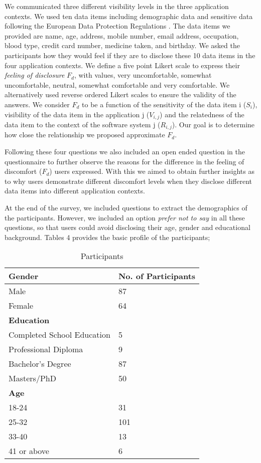 \documentclass[10pt]{article}
\begin{document}
We communicated three different visibility levels in the three application contexts. We used ten data items including demographic data and sensitive data following the European Data Protection Regulations \cite {wagner2016national}. The data items we provided are name, age, address, mobile number, email address, occupation, blood type, credit card number, medicine taken, and birthday. We asked the participants how they would feel if they are to disclose these 10 data items in the four application contexts. We define a five point Likert scale to express their \textit{feeling of disclosure} $F_d$, with values, very uncomfortable, somewhat uncomfortable, neutral, somewhat comfortable and very comfortable. We alternatively used reverse ordered Likert scales to ensure the validity of the answers. We consider $F_d$ to be a function of the sensitivity of the data item i ($S_i$), visibility of the data item in the application j ($V_{i,j}$) and the relatedness of the data item to the context of the software system j ($R_{i,j}$). Our goal is to determine how close the relationship we proposed approximate $F_d$.

Following these four questions we also included an open ended question in the questionnaire to further observe the reasons for the difference in the feeling of discomfort ($F_d$) users expressed. With this we aimed to obtain further insights as to why users demonstrate different discomfort levels when they disclose different data items into different application contexts. 

At the end of the survey, we included questions to extract the demographics of the participants. However, we included an option \textit{prefer not to say} in all these questions, so that users could avoid disclosing their age, gender and educational background. Tables 4 provides the basic profile of the participants;

\begin{center}
\begin{table}[htbp]
\caption{Participants}
\begin{center}
\begin{tabular}{|l|l|} 
\hline
\textbf{Gender} & \textbf{No. of Participants} \\
\hline
Male & 87 \\
\hline
Female & 64 \\
\hline
\multicolumn{2}{l}{\textbf{Education}} \\
\hline
Completed School Education & 5 \\
\hline
Professional Diploma & 9 \\
\hline
Bachelor's Degree & 87 \\
\hline
Masters/PhD & 50 \\
\hline
\multicolumn{2}{l}{\textbf{Age}} \\
\hline
18-24  & 31 \\
\hline
25-32 & 101 \\
\hline
33-40& 13 \\
\hline
41 or above & 6\\
\hline
\end{tabular}
\end{center}
\end{table}
\end{center} 
\end{document}
